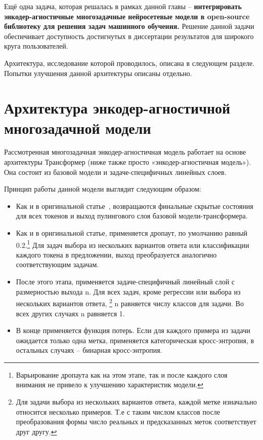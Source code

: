 Ещё одна задача, которая решалась в рамках данной главы -- \textbf{интегрировать энкодер-агностичные многозадачные нейросетевые модели в open-source библиотеку для решения задач машинного обучения.} Решение данной задачи обеспечивает доступность достигнутых в диссертации результатов для широкого круга пользователей.

Архитектура, исследование которой проводилось, описана в следующем разделе. Попытки улучшения данной архитектуры описаны отдельно. 

\section{Архитектура энкодер-агностичной многозадачной модели}\label{ch:tr-ag:architecture}
Рассмотренная многозадачная энкодер-агностичная модель работает на основе архитектуры Трансформер (ниже также просто «энкодер-агностичная модель»). Она состоит из базовой модели и задаче-специфичных линейных слоев.

Принцип работы данной модели выглядит следующим образом:
\begin{itemize}

  \item Как и в оригинальной статье~\cite{bert}, возвращаются финальные скрытые состояния для всех токенов и выход пулингового слоя базовой модели-трансформера. 
  
  \item Как и в оригинальной статье, применяется дропаут, по умолчанию равный 0.2.\footnote{Варьирование дропаута как на этом этапе, так и после каждого слоя внимания не привело к улучшению характеристик модели.} Для задач выбора из нескольких вариантов ответа или классификации каждого токена в предложении, выход преобразуется аналогично соответствующим задачам.

  \item После этого этапа, применяется задаче-специфичный линейный слой с размерностью выхода {n}. Для всех задач, кроме регрессии или выбора из нескольких вариантов ответа, \footnote{Для задачи выбора из нескольких вариантов ответа, каждой метке изначально относится несколько примеров. Т.е с таким числом классов после преобразования формы число реальных и предсказанных меток соответствует друг другу.} {n} равняется числу классов для задачи. Во всех других случаях {n} равняется 1.
 
  \item В конце применяется функция потерь. Если для каждого примера из задачи ожидается только одна метка, применяется категорическая кросс-энтропия, в остальных случаях -- бинарная кросс-энтропия. 

\end{itemize}

